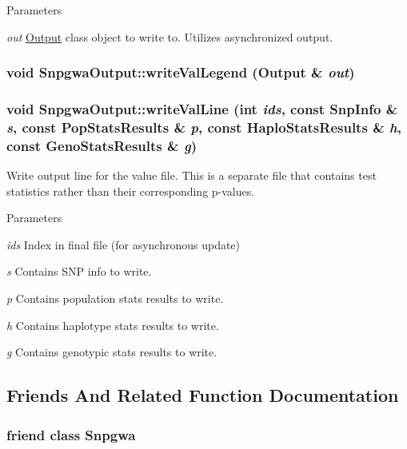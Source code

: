 \begin{DoxyParams}{Parameters}
\item[{\em out}]\hyperlink{classOutput}{Output} class object to write to. Utilizes asynchronized output. \end{DoxyParams}
\hypertarget{classSnpgwaOutput_a2499f64888296d1e418175cf4742d506}{
\subsubsection[{writeValLegend}]{\setlength{\rightskip}{0pt plus 5cm}void SnpgwaOutput::writeValLegend ({\bf Output} \& {\em out})}}
\label{classSnpgwaOutput_a2499f64888296d1e418175cf4742d506}
\hypertarget{classSnpgwaOutput_ae00da2c5932ccf64bb0b69248ae1a9c2}{
\subsubsection[{writeValLine}]{\setlength{\rightskip}{0pt plus 5cm}void SnpgwaOutput::writeValLine (int {\em ids}, \/  const {\bf SnpInfo} \& {\em s}, \/  const {\bf PopStatsResults} \& {\em p}, \/  const {\bf HaploStatsResults} \& {\em h}, \/  const {\bf GenoStatsResults} \& {\em g})}}
\label{classSnpgwaOutput_ae00da2c5932ccf64bb0b69248ae1a9c2}
Write output line for the value file. This is a separate file that contains test statistics rather than their corresponding p-\/values.


\begin{DoxyParams}{Parameters}
\item[{\em ids}]Index in final file (for asynchronous update) \item[{\em s}]Contains SNP info to write. \item[{\em p}]Contains population stats results to write. \item[{\em h}]Contains haplotype stats results to write. \item[{\em g}]Contains genotypic stats results to write. \end{DoxyParams}


\subsection{Friends And Related Function Documentation}
\hypertarget{classSnpgwaOutput_aa527c01a3a830865c14e42f7d302622d}{
\subsubsection[{Snpgwa}]{\setlength{\rightskip}{0pt plus 5cm}friend class {\bf Snpgwa}}}
\label{classSnpgwaOutput_aa527c01a3a830865c14e42f7d302622d}


